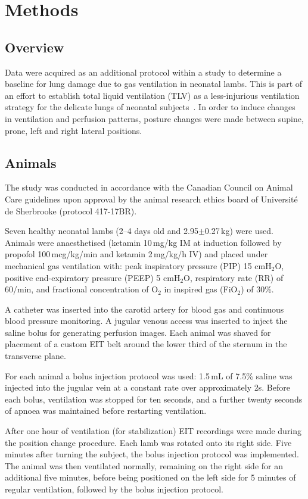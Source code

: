 \section{Methods}
\subsection{Overview}
Data were acquired as an additional protocol within 
a study to determine a baseline for 
lung damage due to gas ventilation in neonatal lambs. 
This is part of an effort to establish total liquid ventilation (TLV) as a less-injurious 
ventilation strategy for the delicate lungs of neonatal 
subjects~\parencite{sage_assessing_2018}. In order to induce changes in ventilation 
and perfusion patterns, 
posture changes were made between supine, prone, left and right lateral positions. 


\subsection{Animals}  \label{animals}
The study was conducted in accordance with the Canadian Council 
on Animal Care guidelines upon approval by the animal research ethics 
board of Universit\'e de Sherbrooke (protocol 417-17BR). 

Seven healthy neonatal lambs (2--4
days old and 2.95$\pm$0.27\,kg) were used.
Animals were anaesthetised (ketamin 10\,mg/kg IM at induction followed by 
propofol 100\,mcg/kg/min and ketamin 2\,mg/kg/h IV) and placed 
under mechanical gas ventilation with: peak inspiratory pressure 
(PIP) 15 cmH$_2$O, positive end-expiratory pressure (PEEP) 5 cmH$_2$O, 
respiratory rate (RR) of 60/min, and fractional concentration of O$_2$ in 
inspired gas (FiO$_2$) of 30\%.

A catheter was inserted into the carotid artery for blood gas and 
continuous blood pressure monitoring. A jugular venous access was inserted 
to inject the saline bolus for generating perfusion images. Each 
animal was shaved for placement of a custom EIT belt 
around the lower third of the sternum in the transverse plane.

For each animal a bolus injection protocol was used: 
1.5\,mL of 7.5\% saline was injected into the jugular vein
at a constant rate over approximately 2s.
Before each bolus, ventilation was stopped for ten seconds,
and a further twenty seconds of apnoea was maintained before
restarting ventilation.

After one hour of ventilation (for stabilization) EIT recordings were made 
during the position change procedure. Each lamb was rotated
onto its right side. Five minutes after turning
the subject, the bolus injection protocol was implemented.
The animal was then ventilated normally, remaining on the right side for 
an additional five minutes, before being positioned on the left side 
for 5 minutes of regular ventilation, followed by the bolus
injection protocol.

